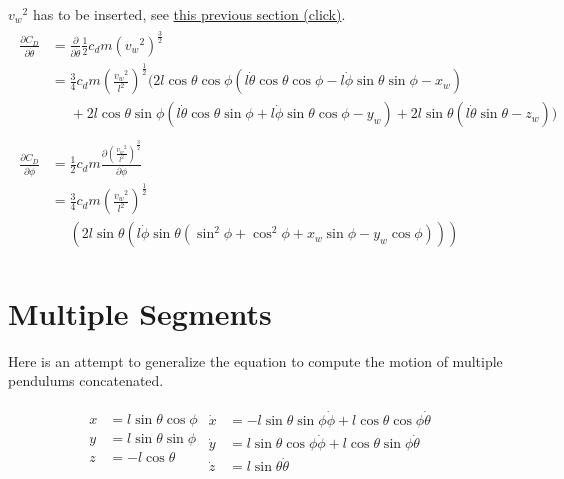 \documentclass{scrartcl}
\begin{document}
${v_w}^2$ has to be inserted, see \hyperref[ssec:rvelocity]{this previous section (click)}.
\begin{align}
  \begin{split}
  \frac{\partial C_D}{\partial \dot{\theta}}   &=\frac{\partial }{\partial \dot{\theta}} \frac{1}{2} c_{d} m ({v_w}^2)^{\frac{3}{2}}      \\
  & = \frac{3}{4} c_{d} m
  (\frac{{v_w}^2}{l^2})^\frac{1}{2}
  (2 l \cos\theta \cos\phi (l \dot{\theta} \cos\theta \cos\phi - l \dot{\phi} \sin\theta \sin\phi - x_w)
  \\&\phantom{{}={}}+ 2 l \cos\theta  \sin\phi (l \dot{\theta} \cos\theta \sin\phi +l \dot{\phi} \sin\theta \cos\phi - y_w)
  + 2 l \sin\theta (l \dot{\theta} \sin\theta - z_w))
  \end{split}
  \\
  \begin{split}
  \frac{\partial C_D}{\partial \dot{\phi}}   
  & = \frac{1}{2} c_{d} m \frac{\partial (\frac{{v_w}^2}{l^2})^{\frac{3}{2}} }{\partial \dot{\phi}} \\
  & = \frac{3}{4} c_{d} m
  (\frac{{v_w}^2}{l^2})^\frac{1}{2}                    
  \\&\phantom{{}={}}(2 l \sin\theta (l \dot{\phi} \sin\theta (\sin^2\phi + \cos^2\phi + x_w \sin\phi - y_w \cos\phi)))
\end{split}
\end{align}








\section{Multiple Segments}

Here is an attempt to generalize the equation to compute the motion of multiple pendulums concatenated.

\begin{align}
  \begin{split}
    x& = l \sin{\theta} \cos{\phi}\\
    y& = l \sin{\theta} \sin{\phi}\\
    z& = -l \cos{\theta}\\
  \end{split}
  \begin{split}
    \dot{x}& = -l\sin{\theta} \sin{\phi} \dot{\phi} + l\cos{\theta}\cos{\phi} \dot{\theta}\\
    \dot{y}& = l\sin{\theta} \cos\phi \dot{\phi} + l\cos\theta\sin{\phi} \dot{\theta}\\
    \dot{z}& = l\sin\theta \dot{\theta}
  \end{split}
\end{align}
\end{document}
